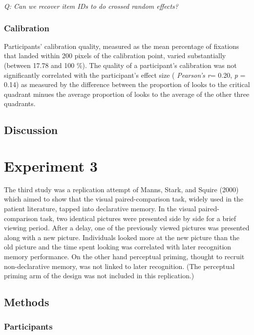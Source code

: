 \documentclass[
  man,floatsintext]{apa6}
\begin{document}
\emph{Q: Can we recover item IDs to do crossed random effects?}

\hypertarget{calibration-1}{%
\subsubsection{Calibration}\label{calibration-1}}

Participants' calibration quality, measured as the mean percentage of fixations that landed within 200 pixels of the calibration point, varied substantially (between 17.78 and 100 \%).
The quality of a participant's calibration was not significantly correlated with the participant's effect size ( \emph{Pearson's r}= 0.20, \emph{p} = 0.14) as measured by the difference between the proportion of looks to the critical quadrant minues the average proportion of looks to the average of the other three quadrants.

\hypertarget{discussion-1}{%
\subsection{Discussion}\label{discussion-1}}

\hypertarget{experiment-3}{%
\section{Experiment 3}\label{experiment-3}}

The third study was a replication attempt of
Manns, Stark, and Squire (2000) which aimed to show that the visual
paired-comparison task, widely used in the patient literature, tapped
into declarative memory. In the visual paired-comparison task, two
identical pictures were presented side by side for a brief viewing
period. After a delay, one of the previously viewed pictures was
presented along with a new picture. Individuals looked more at the new
picture than the old picture and the time spent looking was correlated
with later recognition memory performance. On the other hand perceptual
priming, thought to recruit non-declarative memory, was not linked to
later recognition. (The perceptual priming arm of the design was not
included in this replication.)

\hypertarget{methods-2}{%
\subsection{Methods}\label{methods-2}}

\hypertarget{participants-3}{%
\subsubsection{Participants}\label{participants-3}}
\end{document}
